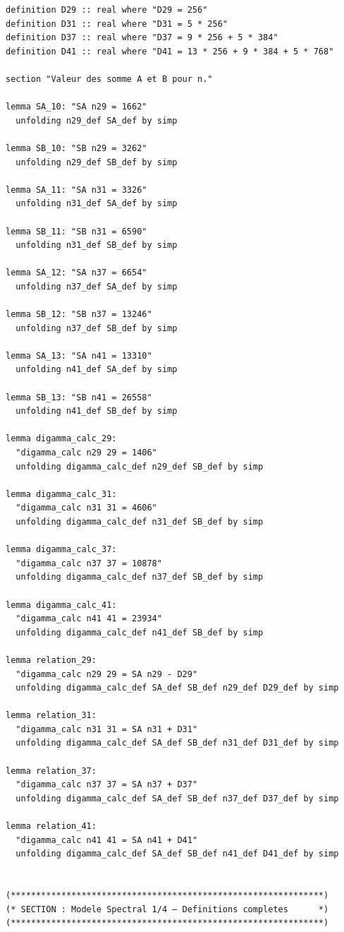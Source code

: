 \documentclass[a4paper,11pt]{article}
\begin{document}
\begin{holcode}[title={\textcolor{white}{File: methode\_spectral.thy -- Part 1/4}}]
\begin{lstlisting}
definition D29 :: real where "D29 = 256"
definition D31 :: real where "D31 = 5 * 256"
definition D37 :: real where "D37 = 9 * 256 + 5 * 384"
definition D41 :: real where "D41 = 13 * 256 + 9 * 384 + 5 * 768"

section "Valeur des somme A et B pour n."

lemma SA_10: "SA n29 = 1662"
  unfolding n29_def SA_def by simp

lemma SB_10: "SB n29 = 3262"
  unfolding n29_def SB_def by simp

lemma SA_11: "SA n31 = 3326"
  unfolding n31_def SA_def by simp

lemma SB_11: "SB n31 = 6590"
  unfolding n31_def SB_def by simp

lemma SA_12: "SA n37 = 6654"
  unfolding n37_def SA_def by simp

lemma SB_12: "SB n37 = 13246"
  unfolding n37_def SB_def by simp

lemma SA_13: "SA n41 = 13310"
  unfolding n41_def SA_def by simp

lemma SB_13: "SB n41 = 26558"
  unfolding n41_def SB_def by simp

lemma digamma_calc_29:
  "digamma_calc n29 29 = 1406"
  unfolding digamma_calc_def n29_def SB_def by simp

lemma digamma_calc_31:
  "digamma_calc n31 31 = 4606"
  unfolding digamma_calc_def n31_def SB_def by simp

lemma digamma_calc_37:
  "digamma_calc n37 37 = 10878"
  unfolding digamma_calc_def n37_def SB_def by simp

lemma digamma_calc_41:
  "digamma_calc n41 41 = 23934"
  unfolding digamma_calc_def n41_def SB_def by simp

lemma relation_29:
  "digamma_calc n29 29 = SA n29 - D29"
  unfolding digamma_calc_def SA_def SB_def n29_def D29_def by simp

lemma relation_31:
  "digamma_calc n31 31 = SA n31 + D31"
  unfolding digamma_calc_def SA_def SB_def n31_def D31_def by simp

lemma relation_37:
  "digamma_calc n37 37 = SA n37 + D37"
  unfolding digamma_calc_def SA_def SB_def n37_def D37_def by simp

lemma relation_41:
  "digamma_calc n41 41 = SA n41 + D41"
  unfolding digamma_calc_def SA_def SB_def n41_def D41_def by simp


(**************************************************************)
(* SECTION : Modele Spectral 1/4 – Definitions completes      *)
(**************************************************************)


\end{lstlisting}
\end{holcode}
\end{document}
